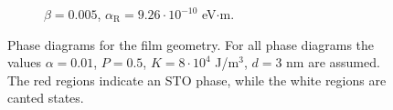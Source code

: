 \begin{figure}[h!]
\begin{subfigure}{.49\textwidth}
  \caption{$\beta = 0.005$, $\alpha_\text{R} = 9.26\cdot10^{-10}$ eV$\cdot$m.}
\end{subfigure}

\caption{Phase diagrams for the film geometry. For all phase diagrams the values $\alpha=0.01$, $P=0.5$, $K=8\cdot10^4$ J/m$^3$, $d=3$ nm are assumed. The red regions indicate an STO phase, while the white regions are canted states. }
\label{fig:STOFilmPhase}
\end{figure}

